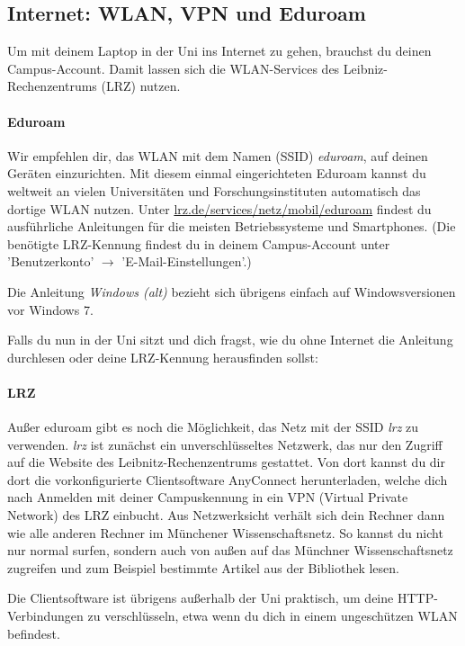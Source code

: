 \documentclass[twoside,12pt,parskip=half-]{scrartcl}
\begin{document}
\subsection{Internet: WLAN, VPN und Eduroam}

Um mit deinem Laptop in der Uni ins Internet zu gehen, brauchst du
deinen Campus-Account. Damit lassen sich die WLAN-Services des
Leibniz-Rechen\-zentrums (LRZ) nutzen.

\paragraph{Eduroam}
Wir empfehlen dir, das WLAN mit dem Namen (SSID) \emph{eduroam}, auf deinen Geräten einzurichten. Mit diesem einmal eingerichteten Eduroam kannst du weltweit an vielen Universitäten und Forschungsinstituten automatisch das dortige WLAN nutzen. Unter \url{lrz.de/services/netz/mobil/eduroam} findest du ausführliche Anleitungen für die meisten Betriebssysteme und Smartphones.
(Die benötigte LRZ-Kennung findest du in deinem Campus-Account unter 'Benutzerkonto' $\rightarrow$ 'E-Mail-Einstellungen'.)

Die Anleitung \emph{Windows (alt)} bezieht sich übrigens einfach auf
Windowsversionen vor Windows 7.

Falls du nun in der Uni sitzt und dich fragst, wie du ohne Internet
die Anleitung durchlesen oder deine LRZ-Kennung herausfinden sollst:

\paragraph{LRZ}

Außer eduroam gibt es noch die Möglichkeit, das Netz mit der SSID
\emph{lrz} zu verwenden. \emph{lrz} ist zunächst ein unverschlüsseltes
Netzwerk, das nur den Zugriff auf die Website des
Leibnitz-Rechenzentrums gestattet. Von dort kannst du dir dort die
vorkonfigurierte Clientsoftware AnyConnect herunterladen, welche dich
nach Anmelden mit deiner Campuskennung in ein VPN (Virtual Private
Network) des LRZ einbucht. Aus Netzwerksicht verhält sich dein Rechner
dann wie alle anderen Rechner im Münchener Wissenschaftsnetz. So
kannst du nicht nur normal surfen, sondern auch von außen auf das
Münchner Wissenschaftsnetz zugreifen und zum Beispiel bestimmte
Artikel aus der Bibliothek lesen.

Die Clientsoftware ist übrigens außerhalb der Uni praktisch, um deine
HTTP-Verbindungen zu verschlüsseln, etwa wenn du dich in einem
ungeschützen WLAN befindest.
\end{document}
